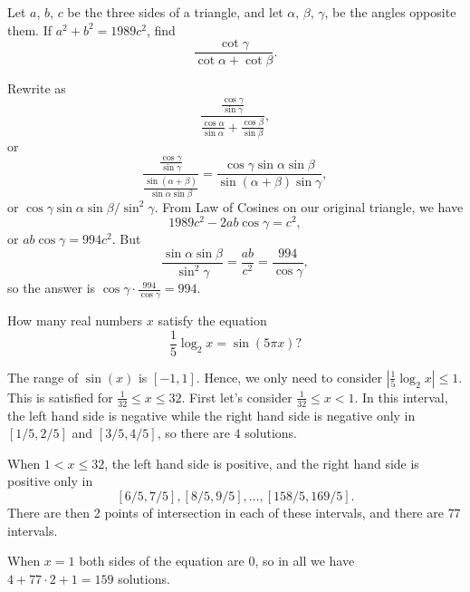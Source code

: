 \begin{question}[name={1989 AIME, \href{https://artofproblemsolving.com/community/c4p436567}{Problem 10}}]
	Let $a$, $b$, $c$ be the three sides of a triangle, and let $\alpha$, $\beta$, $\gamma$, be the angles opposite them. If $a^2+b^2=1989c^2$, find\[ \frac{\cot \gamma}{\cot \alpha+\cot \beta}. \]
\end{question}


\begin{solution}[name={Solution by OlympusHero}]
	Rewrite as $$\displaystyle\frac{\displaystyle\frac{\cos \gamma}{\sin \gamma}}{\displaystyle\frac{\cos \alpha}{\sin \alpha}+\frac{\cos \beta}{\sin \beta}},$$ or $$\displaystyle\frac{\displaystyle\frac{\cos \gamma}{\sin \gamma}}{\displaystyle\frac{\sin(\alpha + \beta)}{\sin \alpha \sin \beta}}=\frac{\cos \gamma \sin \alpha \sin \beta}{\sin(\alpha + \beta)\sin \gamma},$$ or ${\cos \gamma \sin \alpha \sin \beta}/{\sin^2 \gamma}$. From Law of Cosines on our original triangle, we have $$1989c^2-2ab \cos \gamma = c^2,$$ or $ab \cos \gamma = 994c^2$. But $$\frac{\sin \alpha \sin \beta}{\sin^2 \gamma}=\frac{ab}{c^2} = \frac{994}{\cos \gamma},$$ so the answer is $\cos \gamma \cdot \frac{994}{\cos \gamma}=\boxed{994}$.
\end{solution}










\begin{question}[name={1991 AIME, \href{https://artofproblemsolving.com/community/c4p409912}{Problem 4}}]
	How many real numbers $x$ satisfy the equation $$\frac{1}{5}\log_2 x = \sin (5\pi x)?$$	
	
\end{question}


\begin{solution}[name={Solution by chess64}]
	The range of $\sin (x)$ is $[-1,1]$. Hence, we only need to consider $\left|\frac{1}{5}\log_2 x\right| \le 1$. This is satisfied for $\frac{1}{32} \le x \le 32$. First let's consider $\frac{1}{32} \le x < 1$. In this interval, the left hand side is negative while the right hand side is negative only in $[1/5,2/5]$ and $[3/5,4/5]$, so there are $4$ solutions.
	
	When $1< x \le 32$, the left hand side is positive, and the right hand side is positive only in $$[6/5,7/5], [8/5,9/5], \dots, [158/5,169/5].$$ There are then 2 points of intersection in each of these intervals, and there are $77$ intervals.
	
	When $x=1$ both sides of the equation are 0, so in all we have $4 + 77 \cdot 2 + 1 = \boxed{159}$ solutions.
\end{solution}







